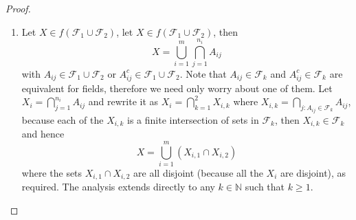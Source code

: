 \documentclass[11pt]{article}
\newcommand{\N}{\mathbb{N}}
\newcommand{\F}{\mathcal{F}}
\newcommand{\un}{\cup}
\newcommand{\ic}{\cap}
\begin{document}
\begin{proof}
\begin{enumerate}
        \item Let $X \in f(\F_1 \un \F_2)$, let $X \in f(\F_1 \un \F_2)$, then
        \[ X = \bigcup_{i=1}^{m} \bigcap_{j=1}^{n_i} A_{ij} \]
        with $A_{ij} \in \F_1 \un \F_2$ or $A_{ij}^{c} \in \F_1 \un \F_2$. Note that $A_{ij} \in \F_k$ and $A_{ij}^{c} \in \F_k$ are equivalent for fields, therefore we need only worry about one of them. Let $X_i = \bigcap_{j=1}^{n_i} A_{ij}$ and rewrite it as $X_i = \bigcap_{k=1}^{2} X_{i, k}$ where $X_{i, k} = \bigcap_{j : A_{ij} \in \F_{k} } A_{ij}$, because each of the $X_{i, k}$ is a finite intersection of sets in $\F_k$, then $X_{i, k} \in \F_k$ and hence
        \[ X = \bigcup_{i=1}^{m} (X_{i, 1} \ic X_{i, 2}) \]
        where the sets $X_{i, 1} \ic X_{i, 2}$ are all disjoint (because all the $X_i$ are disjoint), as required. The analysis extends directly to any $k \in \N$ such that $k \geq 1$.
    \end{enumerate}
\end{proof}
\end{document}
